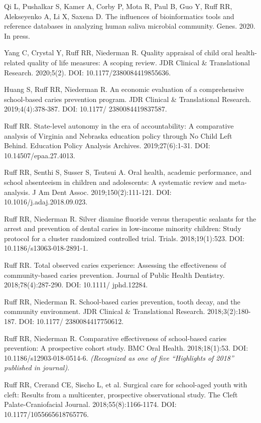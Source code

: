 \documentclass[margin,line]{res}
\begin{document}
\begin{resume}
Qi L, Pushalkar S, Kamer A, Corby P, Mota R, Paul B, Guo Y, Ruff RR, Alekseyenko A, Li X, Saxena D. The influences of bioinformatics tools and reference databases in analyzing human saliva microbial community. Genes. 2020. In press.

Yang C, Crystal Y, Ruff RR, Niederman R. Quality appraisal of child oral health-related quality of life measures: A scoping review. JDR Clinical \& Translational Research. 2020;5(2). DOI: 10.1177/2380084419855636.

Huang S, Ruff RR, Niederman R. An economic evaluation of a comprehensive school-based caries prevention program. JDR Clinical \& Translational Research. 2019;4(4):378-387. DOI:  10.1177/
2380084419837587.

Ruff RR. State-level autonomy in the era of accountability: A comparative analysis of Virginia and Nebraska education policy through No Child Left Behind. Education Policy Analysis Archives. 2019;27(6):1-31. DOI: 10.14507/epaa.27.4013.

Ruff RR, Senthi S, Susser S, Tsutsui A. Oral health, academic performance, and school absenteeism in children and adolescents: A systematic review and meta-analysis. J Am Dent Assoc. 2019;150(2):111-121. DOI: 10.1016/j.adaj.2018.09.023.

Ruff RR, Niederman R. Silver diamine fluoride versus therapeutic sealants for the arrest and prevention of dental caries in low-income minority children: Study protocol for a cluster randomized controlled trial. Trials. 2018;19(1):523. DOI: 10.1186/s13063-018-2891-1.

Ruff RR. Total observed caries experience: Assessing the effectiveness of community-based caries prevention. Journal of Public Health Dentistry. 2018;78(4):287-290. DOI: 10.1111/ jphd.12284.

Ruff RR, Niederman R. School-based caries prevention, tooth decay, and the community environment. JDR Clinical \& Translational Research. 2018;3(2):180-187. DOI: 10.1177/ 2380084417750612.

Ruff RR, Niederman R. Comparative effectiveness of school-based caries prevention: A prospective cohort study. BMC Oral Health. 2018;18(1):53. DOI: 10.1186/s12903-018-0514-6. 
{\em (Recognized as one of five “Highlights of 2018” published in journal)}.

Ruff RR, Crerand CE, Sischo L, et al. Surgical care for school-aged youth with cleft: Results from a multicenter, prospective observational study. The Cleft Palate-Craniofacial Journal. 2018;55(8):1166-1174. DOI: 10.1177/1055665618765776.


\end{resume}
\end{document}
